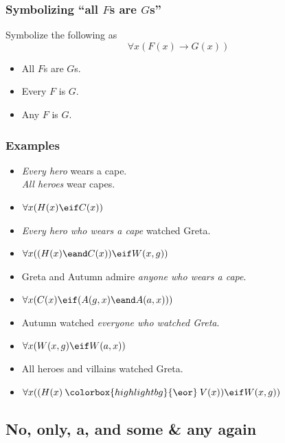 \begin{frame}
\frametitle{Symbolizing ``all $F$s are $G$s''}

Symbolize the following as \emph{\[\forall x(F(x) \to G(x))\]}

\begin{itemize}
  \item All $F$s are $G$s.
  \item Every $F$ is $G$.
  \item Any $F$ is $G$.
\end{itemize}
\end{frame}

\begin{frame}
\frametitle{Examples}

\begin{itemize}[<+->]
  \item \emph{Every hero} wears a cape.\\
  \emph{All heroes} wear capes.\\
  \item[] \alert{$\forall x(H(x) \eif C(x))$}
  \item \emph{Every hero who wears a cape} watched Greta.\\
  \item[] \alert{$\forall x((H(x) \eand C(x)) \eif W(x,g))$}
  \item Greta and Autumn admire \emph{anyone who wears a cape}.
  \item[] \alert{$\forall x(C(x) \eif (A(g,x) \eand A(a,x)))$}
  \item Autumn watched \emph{everyone who watched Greta}.
  \item[] \alert{$\forall x(W(x,g) \eif W(a,x))$}
  \item All heroes and villains watched Greta. 
  \item[] \alert{$\forall x((H(x)
  \mathbin{\colorbox{highlightbg}{\eor}} V(x)) \eif W(x,g))$} 
\end{itemize}
\end{frame}

\subsection{No, only, a, and some \& any again}

